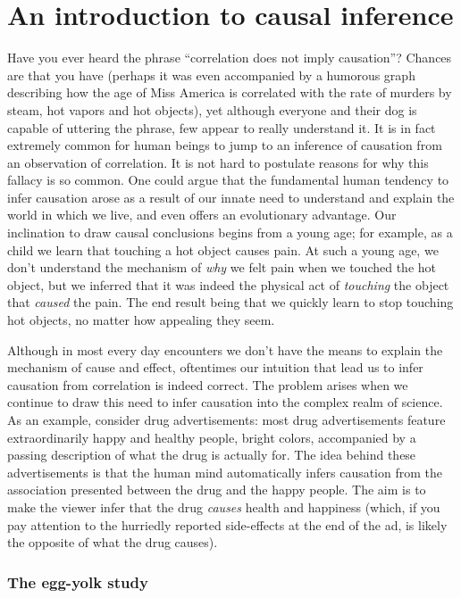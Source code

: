 

\chapter{An introduction to causal inference}
\label{ch:causal}



Have you ever heard the phrase ``correlation does not imply causation''? Chances are that you have (perhaps it was even accompanied by a humorous graph describing how the age of Miss America is correlated with the rate of murders by steam, hot vapors and hot objects), yet although everyone and their dog is capable of uttering the phrase, few appear to really understand it. It is in fact extremely common for human beings to jump to an inference of causation from an observation of correlation. It is not hard to postulate reasons for why this fallacy is so common. One could argue that the fundamental human tendency to infer causation arose as a result of our innate need to understand and explain the world in which we live, and even offers an evolutionary advantage. Our inclination to draw causal conclusions begins from a young age; for example, as a child we learn that touching a hot object causes pain. At such a young age, we don't understand the mechanism of \textit{why} we felt pain when we touched the hot object, but we inferred that it was indeed the physical act of \emph{touching} the object that \emph{caused} the pain. The end result being that we quickly learn to stop touching hot objects, no matter how appealing they seem.

Although in most every day encounters we don't have the means to explain the mechanism of cause and effect, oftentimes our intuition that lead us to infer causation from correlation is indeed correct. The problem arises when we continue to draw this need to infer causation into the complex realm of science. As an example, consider drug advertisements: most drug advertisements feature extraordinarily happy and healthy people, bright colors, accompanied by a passing description of what the drug is actually for. The idea behind these advertisements is that the human mind automatically infers causation from the association presented between the drug and the happy people. The aim is to make the viewer infer that the drug \emph{causes} health and happiness (which, if you pay attention to the hurriedly reported side-effects at the end of the ad, is likely the opposite of what the drug causes). 

\subsection*{The egg-yolk study}


